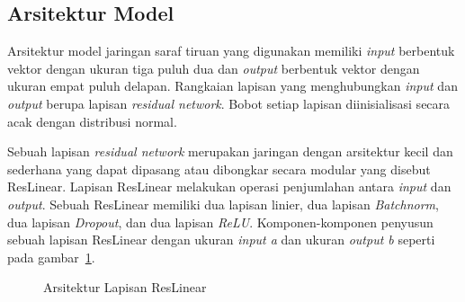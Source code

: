 \pagebreak

\subsection{Arsitektur Model}

Arsitektur model jaringan saraf tiruan yang digunakan memiliki \textit{input} berbentuk vektor dengan ukuran
tiga puluh dua dan \textit{output} berbentuk vektor dengan ukuran empat puluh delapan. Rangkaian lapisan yang
menghubungkan \textit{input} dan \textit{output} berupa lapisan \textit{residual network}. Bobot setiap
lapisan diinisialisasi secara acak dengan distribusi normal.


Sebuah lapisan \textit{residual network} merupakan jaringan dengan arsitektur kecil dan sederhana yang
dapat dipasang atau dibongkar secara modular yang disebut ResLinear. Lapisan ResLinear melakukan operasi
penjumlahan antara \textit{input} dan \textit{output}. Sebuah ResLinear memiliki dua
lapisan linier, dua lapisan \textit{Batchnorm}, dua lapisan \textit{Dropout}, dan dua lapisan \textit{ReLU}.
Komponen-komponen penyusun sebuah lapisan ResLinear dengan ukuran \textit{input a} dan ukuran \textit{output b} seperti
pada gambar~\ref{fig:reslinear}.

\begin{figure}[htbp]
    \begin{center}
    \end{center}
    \vspace{-20pt}
    \captionsetup{labelfont=bf, textfont=bf}
    \caption{Arsitektur Lapisan ResLinear}
    \vspace{-10pt}
    \captionsetup{labelfont=md, textfont=md}
    \label{fig:reslinear}
\end{figure}

